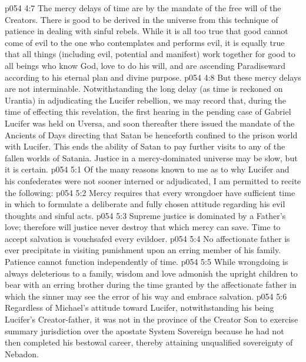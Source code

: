 \vs p054 4:7 The mercy delays of time are by the mandate of the free will of the Creators. There is good to be derived in the universe from this technique of patience in dealing with sinful rebels. While it is all too true that good cannot come of evil to the one who contemplates and performs evil, it is equally true that all things (including evil, potential and manifest) work together for good to all beings who know God, love to do his will, and are ascending Paradiseward according to his eternal plan and divine purpose.
\vs p054 4:8 But these mercy delays are not interminable. Notwithstanding the long delay (as time is reckoned on Urantia) in adjudicating the Lucifer rebellion, we may record that, during the time of effecting this revelation, the first hearing in the pending case of Gabriel  Lucifer was held on Uversa, and soon thereafter there issued the mandate of the Ancients of Days directing that Satan be henceforth confined to the prison world with Lucifer. This ends the ability of Satan to pay further visits to any of the fallen worlds of Satania. Justice in a mercy\hyp{}dominated universe may be slow, but it is certain.\plusone
{}
\vs p054 5:1 Of the many reasons known to me as to why Lucifer and his confederates were not sooner interned or adjudicated, I am permitted to recite the following:
\pc \vs p054 5:2 \bibnobreakspace Mercy requires that every wrongdoer have sufficient time in which to formulate a deliberate and fully chosen attitude regarding his evil thoughts and sinful acts.
\pc \vs p054 5:3 \bibnobreakspace Supreme justice is dominated by a Father’s love; therefore will justice never destroy that which mercy can save. Time to accept salvation is vouchsafed every evildoer.
\pc \vs p054 5:4 \bibnobreakspace No affectionate father is ever precipitate in visiting punishment upon an erring member of his family. Patience cannot function independently of time.
\pc \vs p054 5:5 \bibnobreakspace While wrongdoing is always deleterious to a family, wisdom and love admonish the upright children to bear with an erring brother during the time granted by the affectionate father in which the sinner may see the error of his way and embrace salvation.
\pc \vs p054 5:6 \bibnobreakspace Regardless of Michael’s attitude toward Lucifer, notwithstanding his being Lucifer’s Creator\hyp{}father, it was not in the province of the Creator Son to exercise summary jurisdiction over the apostate System Sovereign because he had not then completed his bestowal career, thereby attaining unqualified sovereignty of Nebadon.
